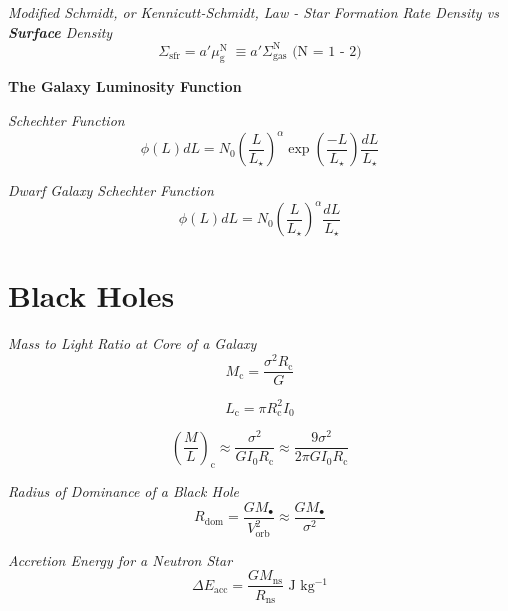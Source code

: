 \documentclass{spy}
\begin{document}
\textit {Modified Schmidt, or Kennicutt-Schmidt, Law - Star Formation Rate Density vs \textbf{Surface} Density}
\begin{equation}
\Sigma_\mathrm{sfr} = a' \mu^\mathrm{N}_\mathrm{g} \; \equiv a' \Sigma^\mathrm{N}_\mathrm{gas} \text{ (N = 1 - 2)}
\end{equation}

\textbf {The Galaxy Luminosity Function}


\textit {Schechter Function}
\begin{equation}
\phi(L) dL = N_\mathrm{0} \left( \frac {L}{L_\star} \right)^\alpha \exp \left( \frac {-L}{L_\star} \right) \frac {dL}{L_\star}
\end{equation}

\textit {Dwarf Galaxy Schechter Function}
\begin{equation}
\phi(L) dL = N_\mathrm{0} \left( \frac {L}{L_\star} \right)^\alpha \frac {dL}{L_\star}
\end{equation}



\newpage

\section{Black Holes}

\textit{Mass to Light Ratio at Core of a Galaxy}
\begin{equation}
M_\mathrm{c} = \frac{\sigma^2 R_\mathrm{c}}{G}
\end{equation}

\begin{equation}
L_\mathrm{c} = \pi R^2_\mathrm{c} I_\mathrm{0}
\end{equation}

\begin{equation}
\left(\frac{M}{L} \right)_\mathrm{c} \approx \frac{\sigma^2}{G I_\mathrm{0} R_\mathrm{c}}  \approx \frac{9\sigma^2}{2 \pi G I_\mathrm{0} R_\mathrm{c}}
\end{equation}

\textit{Radius of Dominance of a Black Hole}
\begin{equation}
R_\mathrm{dom} = \frac{G M_\bullet}{V^2_\mathrm{orb}} \approx \frac{G M_\bullet}{\sigma^2}
\end{equation}

\textit{Accretion Energy for a Neutron Star}
\begin{equation}
\Delta E_\mathrm{acc}  = \frac{G M_\mathrm{ns}}{R_\mathrm{ns}} \text{  J kg\(^{-1}\)}
\end{equation}
\end{document}
